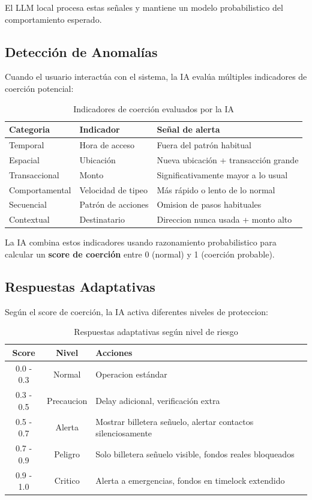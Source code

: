 \documentclass[12pt,a4paper,twoside]{book}
\begin{document}
El LLM local procesa estas señales y mantiene un modelo probabilistico del comportamiento esperado.

\subsection{Detección de Anomalías}

Cuando el usuario interactúa con el sistema, la IA evalúa múltiples indicadores de coerción potencial:

\begin{table}[h]
\centering
\caption{Indicadores de coerción evaluados por la IA}
\label{tab:indicadores_coerción}
\begin{tabular}{p{3.5cm}p{4cm}p{5cm}}
\toprule
\textbf{Categoria} & \textbf{Indicador} & \textbf{Señal de alerta} \\
\midrule
Temporal & Hora de acceso & Fuera del patrón habitual \\
Espacial & Ubicación & Nueva ubicación + transacción grande \\
Transaccional & Monto & Significativamente mayor a lo usual \\
Comportamental & Velocidad de tipeo & Más rápido o lento de lo normal \\
Secuencial & Patrón de acciones & Omision de pasos habituales \\
Contextual & Destinatario & Direccion nunca usada + monto alto \\
\bottomrule
\end{tabular}
\end{table}

La IA combina estos indicadores usando razonamiento probabilistico para calcular un \textbf{score de coerción} entre 0 (normal) y 1 (coerción probable).

\subsection{Respuestas Adaptativas}

Según el score de coerción, la IA activa diferentes niveles de proteccion:

\begin{table}[h]
\centering
\caption{Respuestas adaptativas según nivel de riesgo}
\label{tab:respuestas_adaptativas}
\begin{tabular}{ccp{8cm}}
\toprule
\textbf{Score} & \textbf{Nivel} & \textbf{Acciones} \\
\midrule
0.0 - 0.3 & Normal & Operacion estándar \\
0.3 - 0.5 & Precaucion & Delay adicional, verificación extra \\
0.5 - 0.7 & Alerta & Mostrar billetera señuelo, alertar contactos silenciosamente \\
0.7 - 0.9 & Peligro & Solo billetera señuelo visible, fondos reales bloqueados \\
0.9 - 1.0 & Critico & Alerta a emergencias, fondos en timelock extendido \\
\bottomrule
\end{tabular}
\end{table}
\end{document}
